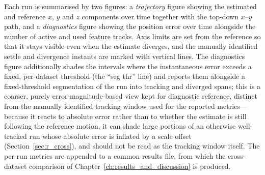 Each run is summarised by two figures: a \emph{trajectory} figure showing the estimated and reference $x$, $y$ and $z$ components over time together with the top-down $x$--$y$ path, and a \emph{diagnostics} figure showing the position error over time alongside the number of active and used feature tracks. Axis limits are set from the reference so that it stays visible even when the estimate diverges, and the manually identified settle and divergence instants are marked with vertical lines. The diagnostics figure additionally shades the intervals where the instantaneous error exceeds a fixed, per-dataset threshold (the ``seg thr'' line) and reports them alongside a fixed-threshold segmentation of the run into tracking and diverged spans; this is a coarser, purely error-magnitude-based view kept for diagnostic reference, distinct from the manually identified tracking window used for the reported metrics---because it reacts to absolute error rather than to whether the estimate is still following the reference motion, it can shade large portions of an otherwise well-tracked run whose absolute error is inflated by a scale offset (Section~\ref{sec:r_cross}), and should not be read as the tracking window itself. The per-run metrics are appended to a common results file, from which the cross-dataset comparison of Chapter~\ref{ch:results_and_discussion} is produced.